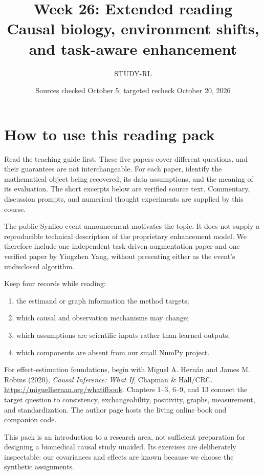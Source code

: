 \documentclass[11pt]{scrartcl}
\title{\textbf{Week 26: Extended reading}\\\large Causal biology, environment shifts, and task-aware enhancement}
\author{STUDY-RL}
\date{Sources checked October 5; targeted recheck October 20, 2026}
\begin{document}
\maketitle

\section*{How to use this reading pack}
Read the teaching guide first. These five papers cover different questions, and
their guarantees are not interchangeable. For each paper, identify the mathematical
object being recovered, its data assumptions, and the meaning of its evaluation.
The short excerpts below are verified source text. Commentary, discussion prompts,
and numerical thought experiments are supplied by this course.

The public Synlico event announcement motivates the topic. It does not supply a
reproducible technical description of the proprietary enhancement model. We therefore
include one independent task-driven augmentation paper and one verified paper by
Yingzhen Yang, without presenting either as the event's undisclosed algorithm.

\begin{keyidea}
Keep four records while reading:
\begin{enumerate}
\item the estimand or graph information the method targets;
\item which causal and observation mechanisms may change;
\item which assumptions are scientific inputs rather than learned outputs;
\item which components are absent from our small NumPy project.
\end{enumerate}
\end{keyidea}

For effect-estimation foundations, begin with Miguel A. Hern\'an and James M.
Robins (2020), \emph{Causal Inference: What If}, Chapman \& Hall/CRC.
\url{https://miguelhernan.org/whatifbook}. Chapters 1--3, 6--9, and 13 connect the
target question to consistency, exchangeability, positivity, graphs, measurement,
and standardization. The author page hosts the living online book and companion code.

This pack is an introduction to a research area, not sufficient preparation for
designing a biomedical causal study unaided. Its exercises are deliberately inspectable:
our covariances and effects are known because we choose the synthetic assignments.
\end{document}
